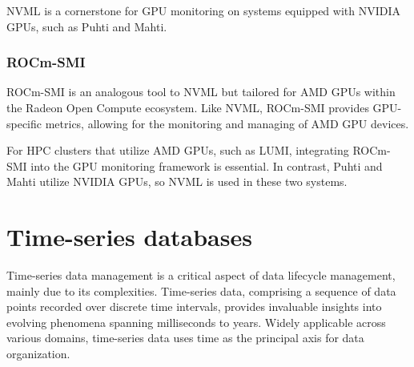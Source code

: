 NVML is a cornerstone for GPU monitoring on systems equipped with NVIDIA GPUs, such as Puhti and Mahti.

\subsubsection{ROCm-SMI}
ROCm-SMI \cite{rocm-smi} is an analogous tool to NVML but tailored for AMD GPUs within the Radeon Open Compute ecosystem. Like NVML, ROCm-SMI provides GPU-specific metrics, allowing for the monitoring and managing of AMD GPU devices.

For HPC clusters that utilize AMD GPUs, such as LUMI, integrating ROCm-SMI into the GPU monitoring framework is essential. In contrast, Puhti and Mahti utilize NVIDIA GPUs, so NVML is used in these two systems.

\section{Time-series databases}





Time-series data management is a critical aspect of data lifecycle management, mainly due to its complexities. Time-series data, comprising a sequence of data points recorded over discrete time intervals, provides invaluable insights into evolving phenomena spanning milliseconds to years. Widely applicable across various domains, time-series data uses time as the principal axis for data organization.

